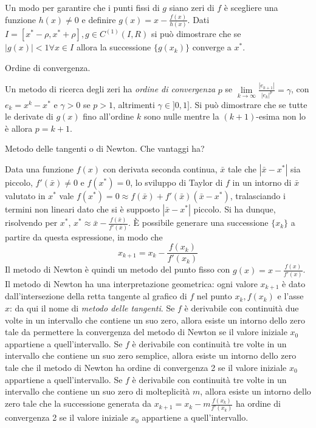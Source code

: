 \documentclass[answers, a4paper]{exam}
\begin{document}
\begin{questions}
\begin{solution}
		Un modo per garantire che i punti fissi di $g$ siano zeri di $f$ è scegliere una funzione $h(x) \neq 0$ e definire $g(x) = x - \frac{f(x)}{h(x)}$.
		Dati  $I = [x^\ast - \rho, x^\ast + \rho], g \in C^{(1)}(I,R)$ si può dimostrare che se $|g(x)| < 1 \forall x \in I$ allora la successione $\{g(x_k)\}$ converge a $x^\ast$. 
	\end{solution}
	\question Ordine di convergenza.
	\begin{solution}
		Un metodo di ricerca degli zeri ha \textit{ordine di convergenza} $p$ se $\lim\limits_{k \longrightarrow \infty} \frac{|e_{k + 1}|}{|e_k|^p} = \gamma$, con $e_k = x^k - x^\ast$ e $\gamma > 0 $ se $p > 1$, altrimenti $\gamma \in ]0, 1]$.
		Si può dimostrare che se tutte le derivate di $g(x)$ fino all'ordine $k$ sono nulle mentre la $(k+1)$-esima non lo è allora $p = k + 1$. 
	\end{solution}
	\question Metodo delle tangenti o di Newton. Che vantaggi ha?
	\begin{solution}
		Data una funzione $f(x)$ con derivata seconda continua, $\bar{x}$ tale che $|\bar{x} - x^\ast|$ sia piccolo, $f'(\bar{x}) \neq 0$ e $f(x^\ast) = 0$, lo sviluppo di Taylor di $f$ in un intorno di $\bar{x}$ valutato in $x^\ast$ vale $f(x^\ast) = 0 \approx f(\bar{x}) + f'(\bar{x})(\bar{x} - x^\ast)$, tralasciando i termini non lineari dato che si è supposto $|\bar{x} - x^\ast|$ piccolo. 
		Si ha dunque, risolvendo per $x^\ast$, $x^\ast \approx \bar{x} - \frac{f(\bar{x})}{f'(\bar{x})}$.
		È possibile generare una successione $\{x_k\}$ a partire da questa espressione, in modo che \begin{equation}x_{k + 1} = x_k - \frac{f(x_k)}{f'(x_k)}\end{equation}
		Il metodo di Newton è quindi un metodo del punto fisso con $g(x) = x - \frac{f(x)}{f'(x)}$. 
		Il metodo di Newton ha una interpretazione geometrica: ogni valore $x_{k+1}$ è dato dall'intersezione della retta tangente al grafico di $f$ nel punto $x_k, f(x_k)$ e l'asse $x$: da qui il nome di \textit{metodo delle tangenti}.
		Se $f$ è derivabile con continuità due volte in un intervallo che contiene un suo zero, allora esiste un intorno dello zero tale da permettere la convergenza del metodo di Newton se il valore iniziale $x_0$ appartiene a quell'intervallo. 
		Se $f$ è derivabile con continuità tre volte in un intervallo che contiene un suo zero semplice, allora esiste un intorno dello zero tale che il metodo di Newton ha ordine di convergenza 2 se il valore iniziale $x_0$ appartiene a quell'intervallo. 
		Se $f$ è derivabile con continuità tre volte in un intervallo che contiene un suo zero di molteplicità $m$, allora esiste un intorno dello zero tale che la successione generata da $x_{k + 1} = x_k - m\frac{f(x_k)}{f'(x_k)}$ ha ordine di convergenza 2 se il valore iniziale $x_0$ appartiene a quell'intervallo. 

\end{solution}
\end{questions}
\end{document}
